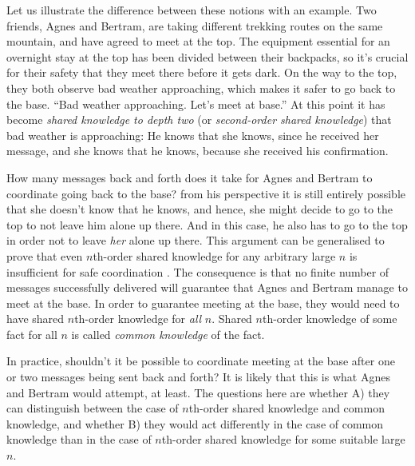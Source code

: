 Let us illustrate the difference between these notions with an example. Two friends, Agnes and Bertram, are taking different trekking routes on the same mountain, and have agreed to meet at the top. The equipment essential for an overnight stay at the top has been divided between their backpacks, so it's crucial for their safety that they meet there before it gets dark. On the way to the top, they both observe bad weather approaching, which makes it safer to go back to the base.  ``Bad weather approaching. Let's meet at base.''  At this point it has become \emph{shared knowledge to depth two} (or \emph{second-order shared knowledge}) that bad weather is approaching: He knows that she knows, since he received her message, and she knows that he knows, because she received his confirmation. 

How many messages back and forth does it take for Agnes and Bertram to coordinate going back to the base?  from his perspective it is still entirely possible that she doesn't know that he knows, and hence, she might decide to go to the top to not leave him alone up there. And in this case, he also has to go to the top in order not to leave \emph{her} alone up there. This argument can be generalised to prove that even $n$th-order shared knowledge for any arbitrary large $n$ is insufficient for safe coordination . The consequence is that no finite number of messages successfully delivered will guarantee that Agnes and Bertram manage to meet at the base. In order to guarantee meeting at the base, they would need to have shared $n$th-order knowledge for \emph{all} $n$. Shared $n$th-order knowledge of some fact for all $n$ is called  \emph{common knowledge} of the fact.

In practice, shouldn't it be possible to coordinate meeting at the base after one or two messages being sent back and forth? It is likely that this is what Agnes and Bertram would attempt, at least. The questions here are whether A) they can distinguish between the case of $n$th-order shared knowledge and common knowledge, and whether B) they would act differently in the case of common knowledge than in the case of $n$th-order shared knowledge for some suitable large $n$. 

